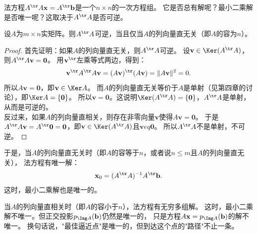 \documentclass[12pt,UTF8]{ctexbook}
\begin{document}
法方程$A^{\tr} A \mathbf{x} = A^{\tr} \mathbf{b}$是一个$n \times n$的一次方程组。
它是否总有解呢？最小二乘解是否唯一呢？这取决于$A^{\tr} A$是否可逆。

\begin{pp}\label{pp:7_11}
设$A$为$m \times n$实矩阵。则$A^{\tr} A$可逆，当且仅当$A$的列向量直无关（即$A$的容为$n$）。
\end{pp}

\begin{proof} %
首先证明：如果$A$的列向量直无关，则$A^{\tr} A$可逆。
设$\mathbf{v} \in \Ker(A^{\tr} A)$，则$A^{\tr} A \mathbf{v} = \mathbf{0}$。
用$\mathbf{v}^{\tr}$左乘等式两边，得到：
$$ \mathbf{v}^{\tr} A^{\tr} A \mathbf{v} = (A\mathbf{v})^{\tr}(A\mathbf{v}) = \|A\mathbf{v}\|^2 = 0. $$
所以$A\mathbf{v} = \mathbf{0}$，即$\mathbf{v} \in \Ker A$。
而$A$的列向量直无关等价于$A$是单射（见第四章的讨论），即$\Ker A = \{\mathbf{0}\}$。
所以$\mathbf{v} = \mathbf{0}$。这说明$\Ker(A^{\tr} A) = \{\mathbf{0}\}$，$A^{\tr} A$是单射，从而是可逆的。\\
反过来，如果$A$的列向量直相关，则存在非零向量$\mathbf{v}$使得$A\mathbf{v} = \mathbf{0}$。
于是$A^{\tr} A \mathbf{v} = A^{\tr} \mathbf{0} = \mathbf{0}$，即$\mathbf{v} \in \Ker(A^{\tr} A)$且$\mathbf{v}
eq \mathbf{0}$。
所以$A^{\tr} A$不是单射，不可逆。
\end{proof}

于是，当$A$的列向量直无关时（即$A$的容等于$n$，或者说$n \leqslant m$且$A$的列向量直无关），
法方程有唯一解：
$$ \mathbf{x}_0 = (A^{\tr} A)^{-1} A^{\tr} \mathbf{b}. $$
这时，最小二乘解也是唯一的。

当$A$的列向量直相关时（即$A$的容小于$n$），法方程有无穷多组解。
这时，最小二乘解不唯一。但正交投影$p_{\Img A}(\mathbf{b})$仍然是唯一的，
只是方程$A\mathbf{x} = p_{\Img A}(\mathbf{b})$的解不唯一。
换句话说，"最佳逼近点"是唯一的，但到达这个点的"路径"不止一条。
\end{document}
